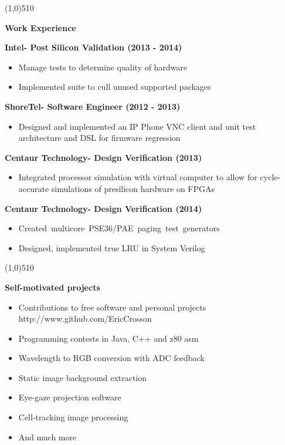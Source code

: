 \documentclass{report}
\newcommand{\cut}{\begin{center} \line(1,0){510} \end{center}}
\begin{document}
\cut{}

\textbf{Work Experience} \\
\begin{paracol}{2}
  \textbf{Intel- Post Silicon Validation (2013 - 2014)}
  \begin{itemize}
    \renewcommand{\labelitemi}{$\circ$}
  \item Manage tests to determine quality of hardware
  \item Implemented suite to cull unused supported packages
  \end{itemize}

  \textbf{ShoreTel- Software Engineer (2012 - 2013)}
  \begin{itemize}
    \renewcommand{\labelitemi}{$\circ$}
  \item Designed and implemented an IP Phone VNC client and unit test architecture and DSL for firmware regression
  \end{itemize}

  \switchcolumn{}
  \textbf{Centaur Technology- Design Verification (2013)}
  \begin{itemize}
    \renewcommand{\labelitemi}{$\circ$}
  \item Integrated processor simulation with virtual computer to allow
    for cycle-accurate simulations of presilicon hardware on FPGAs
  \end{itemize}

  \textbf{Centaur Technology- Design Verification (2014)}
  \begin{itemize}
    \renewcommand{\labelitemi}{$\circ$}
  \item \mbox{Created multicore PSE36/PAE paging test generators}
  \item Designed, implemented true LRU in System Verilog
  \end{itemize}
\end{paracol}

\cut{}

\textbf{Self-motivated projects}
\begin{paracol}{2}

  \begin{itemize}
    \renewcommand{\labelitemi}{$\circ$}
  \item Contributions to free software and personal projects
    http://www.github.com/EricCrosson
  \item Programming contests in Java, C++ and z80 asm
  \item Wavelength to RGB conversion with ADC feedback
  \end{itemize}

  \switchcolumn{}
  \begin{itemize}
    \renewcommand{\labelitemi}{$\circ$}
  \item Static image background extraction
  \item Eye-gaze projection software
  \item Cell-tracking image processing
  \item And much more
  \end{itemize}
\end{paracol}
\end{document}
